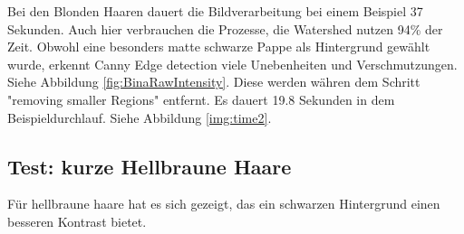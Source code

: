 \documentclass[german,a4paper, 12pt]{llncs}
\begin{document}
Bei den Blonden Haaren dauert die Bildverarbeitung bei einem Beispiel 37 Sekunden. 
Auch hier verbrauchen die Prozesse, die Watershed nutzen 94\% der Zeit.
Obwohl eine besonders matte schwarze Pappe als Hintergrund gewählt wurde, erkennt Canny Edge detection viele Unebenheiten und Verschmutzungen. Siehe Abbildung \ref{fig:BinaRawIntensity}. Diese werden währen dem Schritt "removing smaller Regions" entfernt. Es dauert 19.8 Sekunden in dem Beispieldurchlauf. Siehe Abbildung \ref{img:time2}.

\subsection{Test: kurze Hellbraune Haare}

Für hellbraune haare hat es sich gezeigt, das ein schwarzen Hintergrund einen besseren Kontrast bietet.
\end{document}
